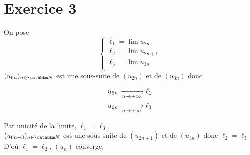 \part{Exercice 3}

On pose
\[
\begin{cases}
	\ell_1 = \lim u_{2n}\\
	\ell_2 = \lim u_{2n + 1}\\
	\ell_3 = \lim u_{3n}\\
\end{cases}
\] 
$(u_{6n})_{n\in\N}$ est une sous-suite de $(u_{2n})$ et de $(u_{3n})$ donc

\begin{align*}
	u_{6n} &\xrightarrow[n\to +\infty]{} \ell_1\\
	u_{6n} &\xrightarrow[n\to +\infty]{} \ell_3
\end{align*}
	
Par unicité de la limite, $\ell_1 = \ell_3$.\\
$(u_{6n+3})_{n\in\N}$ est une sous suite de $(u_{2n+1})$ et de $(u_{3n})$ donc $\ell_2 = \ell_3$\\

D'où $\ell_1 = \ell_2$, $(u_n)$ converge.

